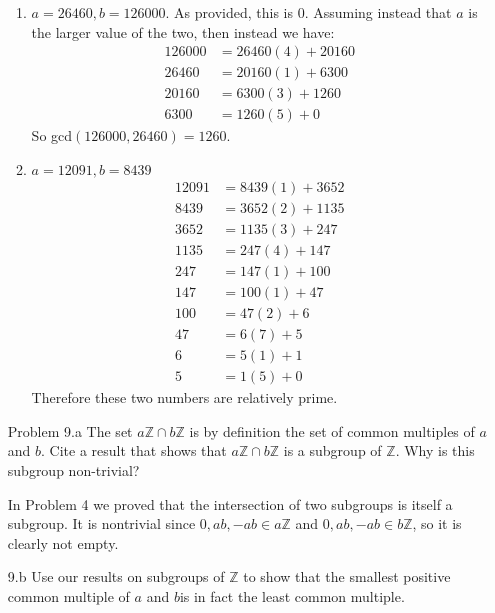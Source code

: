 \documentclass[letterpaper]{article}
\newcommand{\Integers}{\mathbb{Z}}
\begin{document}
\begin{itemize}
          \begin{enumerate}
              \item \(a = 26460, b = 126000\). As provided, this is 0. Assuming instead that \(a\) is the larger value of the two, then instead we have:
                    \begin{align*}
                        126000 & = 26460(4) + 20160 \\
                        26460  & = 20160(1) + 6300  \\
                        20160  & = 6300(3) + 1260   \\
                        6300   & = 1260(5) + 0
                    \end{align*}
                    So gcd\((126000, 26460) = 1260\).
              \item \(a = 12091, b = 8439\)
                    \begin{align*}
                        12091 & = 8439(1) + 3652 \\
                        8439  & = 3652(2) + 1135 \\
                        3652  & = 1135(3) + 247  \\
                        1135  & = 247(4) + 147   \\
                        247   & = 147(1) + 100   \\
                        147   & = 100(1) + 47    \\
                        100   & = 47(2) + 6      \\
                        47    & = 6(7) + 5       \\
                        6     & = 5(1) + 1       \\
                        5     & = 1(5) + 0
                    \end{align*}
                    Therefore these two numbers are relatively prime.
          \end{enumerate}

    \item[Problem 9.a] The set \(a\Integers \cap b\Integers\) is by definition the set of common multiples of \(a\) and \(b\). Cite a result that shows that \(a\Integers \cap b\Integers\) is a subgroup of \(\Integers\). Why is this subgroup non-trivial?

          In Problem 4 we proved that the intersection of two subgroups is itself a subgroup. It is nontrivial since \(0, ab, -ab \in a\Integers\) and \(0, ab, -ab \in b\Integers\), so it is clearly not empty.
    \item[9.b] Use our results on subgroups of \(\Integers\) to show that the smallest positive common multiple of \(a\) and \(b\)is in fact the least common multiple.


\end{itemize}
\end{document}

